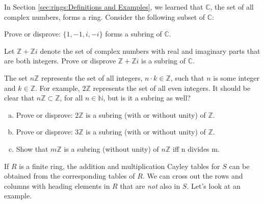 In Section \ref{sec:rings:Definitions and Examples}, we learned that ${\mathbb C}$, the set of all complex numbers, forms a ring.  Consider the following subset of ${\mathbb C}$:

\begin{exercise}
Prove or disprove:  $\{1,-1,i,-i\}$ forms a subring of ${\mathbb C}$.
\end{exercise}

\begin{exercise}
Let ${\mathbb Z}+{\mathbb Z}i$ denote the set of complex numbers with real and imaginary parts that are both integers. Prove or disprove ${\mathbb Z}+{\mathbb Z}i$ is a subring of ${\mathbb C}$.
\end{exercise}

The set $n{\mathbb Z}$ represents the set of all integers, $n\cdot k\in{\mathbb Z}$, such that $n$ is some integer and $k\in{\mathbb Z}$.  For example, $2{\mathbb Z}$ represents the set of all even integers.  It should be clear that $n{\mathbb Z}\subset{\mathbb Z}$, for all $n\in{\mathbb N}$, but is it a subring as well?

\begin{exercise}
\begin{enumerate}[(a)]
\item Prove or disprove: $2{\mathbb Z}$ is a subring (with or without unity)  of ${\mathbb Z}$.
\item Prove or disprove: $3{\mathbb Z}$ is a subring (with or without unity)  of ${\mathbb Z}$.
\item Show that $m{\mathbb Z}$ is a subring (without unity) of $n{\mathbb Z}$ iff n divides m.
\end{enumerate}
\end{exercise}

If $R$ is a finite ring, the addition and multiplication Cayley tables for $S$ can be obtained from the corresponding tables of $R$. We can cross out the rows and columns with heading elements in $R$ that are \emph{not} also in $S$. Let's look at an example.


